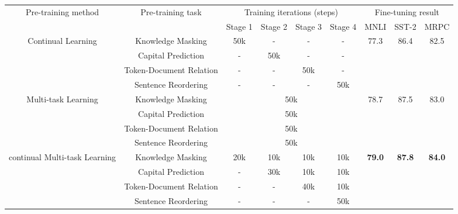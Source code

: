 \documentclass[letterpaper]{article} \usepackage{aaai20}  \usepackage{times}  \usepackage{helvet} \usepackage{courier}  \usepackage[hyphens]{url}  \usepackage{graphicx} \usepackage{makecell}
\begin{document}
\begin{table*}[htbp]
\tabcolsep 0.06in
  \centering
  \small
\begin{tabular}{c|c|cccc|ccc}
\hline \hline
\multirow{2}{*}{Pre-training method} & \multirow{2}{*}{Pre-training task} & \multicolumn{4}{c|}{Training iterations (steps) } &  \multicolumn{3}{c}{Fine-tuning result} \\ \cline{3-9} 
& & Stage 1 & Stage 2 & Stage 3 & Stage 4 & MNLI & SST-2 & MRPC \\ \midrule[1pt]

\multirow{4}{*}{Continual Learning} & Knowledge Masking & 50k & - & - & - & \multirow{4}{*}{77.3} & \multirow{4}{*}{86.4} & \multirow{4}{*}{82.5}\\ \cline{2-6}
                                        & Capital Prediction & - & 50k & - & - & \\  \cline{2-6}
                                        & Token-Document Relation  & - & - & 50k & - & \\  \cline{2-6}
                                        & Sentence Reordering  & - & - & - & 50k &\\\midrule[1pt]
\multirow{4}{*}{Multi-task Learning}  & Knowledge Masking & \multicolumn{4}{c|}{50k} & \multirow{4}{*}{78.7} & \multirow{4}{*}{87.5} & \multirow{4}{*}{83.0}\\  \cline{2-6}
                                        & Capital Prediction & \multicolumn{4}{c|}{50k} &  \\  \cline{2-6}
                                        & Token-Document Relation  & \multicolumn{4}{c|}{50k} &\\  \cline{2-6}
                                        & Sentence Reordering  & \multicolumn{4}{c|}{50k} & \\ \midrule[1pt]
\multirow{4}{*}{continual Multi-task Learning}  & Knowledge Masking & 20k & 10k & 10k & 10k & \multirow{4}{*}{\bf{79.0}}
& \multirow{4}{*}{\bf{87.8}} & \multirow{4}{*}{\bf{84.0}}\\  \cline{2-6}
                                        & Capital Prediction & - & 30k & 10k & 10k & \\  \cline{2-6}
                                        & Token-Document Relation & - & - & 40k & 10k & \\  \cline{2-6}
                                        & Sentence Reordering  & - & - & - & 50k & \\ 
\hline\hline



\end{tabular}
\end{table*}
\end{document}
